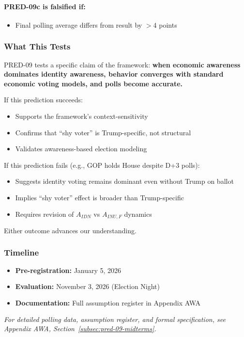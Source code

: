 \paragraph{PRED-09c is falsified if:}
\begin{itemize}
    \item Final polling average differs from result by $>$4 points
\end{itemize}

\subsubsection{What This Tests}

PRED-09 tests a specific claim of the framework: \textbf{when economic 
awareness dominates identity awareness, behavior converges with 
standard economic voting models, and polls become accurate.}

If this prediction succeeds:
\begin{itemize}
    \item Supports the framework's context-sensitivity
    \item Confirms that ``shy voter'' is Trump-specific, not structural
    \item Validates awareness-based election modeling
\end{itemize}

If this prediction fails (e.g., GOP holds House despite D+3 polls):
\begin{itemize}
    \item Suggests identity voting remains dominant even without Trump on ballot
    \item Implies ``shy voter'' effect is broader than Trump-specific
    \item Requires revision of $A_{IDN}$ vs $A_{INU,F}$ dynamics
\end{itemize}

Either outcome advances our understanding.

\subsubsection{Timeline}

\begin{itemize}
    \item \textbf{Pre-registration:} January 5, 2026
    \item \textbf{Evaluation:} November 3, 2026 (Election Night)
    \item \textbf{Documentation:} Full assumption register in Appendix AWA
\end{itemize}

\vspace{1em}
\noindent\textit{For detailed polling data, assumption register, and formal 
specification, see Appendix AWA, Section~\ref{subsec:pred-09-midterms}.}

